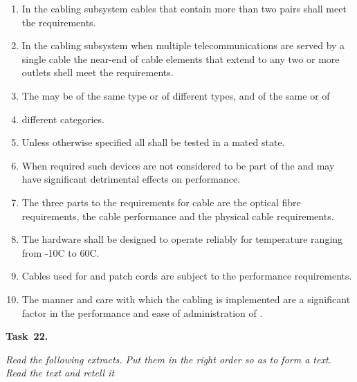 \begin{enumerate}
    \item In the \blank cabling subsystem cables that contain more than two pairs shall meet the requirements.
    \item {In the \blank cabling subsystem when multiple telecommunications \blank are served by a
    single cable the near-end \blank of cable elements that extend to any two or more outlets shell
    meet the requirements.}
    \item The \blank may be of the same type or of different types, and of the same \blank or of
    \item different categories.
    \item Unless otherwise specified all \blank shall be tested in a mated state.
    \item {When required such devices are not considered to be part of the \blank and may have
    significant detrimental effects on \blank performance.}
    \item {The three parts to the requirements for \blank cable are the optical fibre requirements, the
    cable \blank performance and the physical cable requirements}.
    \item The \blank hardware shall be designed to operate reliably for temperature ranging from -10C to 60C.
    \item Cables used for \blank and patch cords are subject to the performance requirements.
    \item {The manner and care with which the cabling is implemented are a significant factor in the
    performance and ease of administration of \blank}.
\end{enumerate}

{\bf Task~22.}~~{\it Read the following extracts. Put them in the right order so as to form a text. Read
the text and retell it \par}

